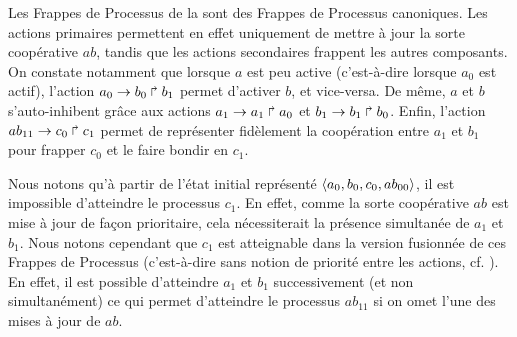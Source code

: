 \begin{example}
  Les Frappes de Processus de la 
  sont des Frappes de Processus canoniques.
  Les actions primaires permettent en effet uniquement de mettre à jour la sorte coopérative $ab$,
  tandis que les actions secondaires frappent les autres composants.
  On constate notamment que lorsque $a$ est peu active (c'est-à-dire lorsque $a_0$ est actif),
  l'action $a_0\rightarrow b_0\Rsh b_1$ permet d'activer $b$, et vice-versa.
  De même, $a$ et $b$ s'auto-inhibent grâce aux actions
  $a_1\rightarrow a_1\Rsh a_0$ et $b_1\rightarrow b_1\Rsh b_0$.
  Enfin, l'action $ab_{11}\rightarrow c_0\Rsh c_1$
  permet de représenter fidèlement la coopération entre $a_1$ et $b_1$ pour
  frapper $c_0$ et le faire bondir en $c_1$.
  
  Nous notons qu'à partir de l'état initial représenté $\mbox{$\langle a_0, b_0, c_0, ab_{00} \rangle$}$,
  il est impossible d'atteindre le processus $c_1$.
  En effet, comme la sorte coopérative $ab$ est mise à jour de façon prioritaire,
  cela nécessiterait la présence simultanée de $a_1$ et $b_1$.
  Nous notons cependant que $c_1$ est atteignable dans la version fusionnée
  de ces Frappes de Processus
  (c'est-à-dire sans notion de priorité entre les actions, cf. ).
  En effet, il est possible d'atteindre $a_1$ et $b_1$ successivement
  (et non simultanément)
  ce qui permet d'atteindre le processus $ab_{11}$ si on omet l'une des mises à jour de $ab$.
  
  \begin{figure}[ht]
    \centering
\end{figure}
\end{example}
